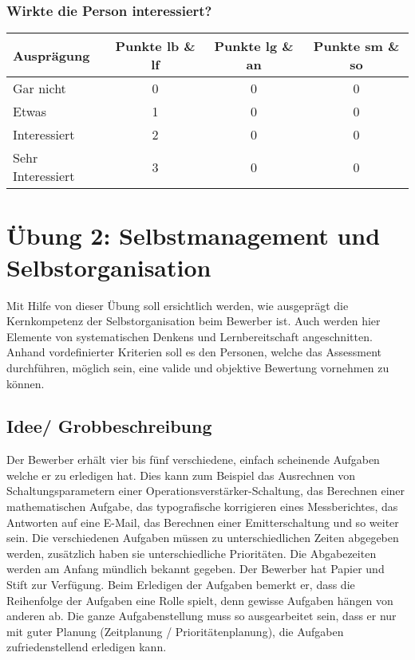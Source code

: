 \subsubsection{Wirkte die Person interessiert?}
\begin{tabular}{| l | c | c | c |}
  \hline	
  \textbf{Ausprägung} & \textbf{Punkte lb \& lf} & \textbf{Punkte lg \& an} & \textbf{Punkte sm \& so} \\
  \hline  		
  Gar nicht & 0  & 0 & 0 \\ 
  \hline
  Etwas & 1 & 0 & 0 \\ 
  \hline
  Interessiert & 2 & 0 & 0 \\
  \hline  
  Sehr Interessiert & 3 & 0 & 0 \\
  \hline  
\end{tabular}



\section{Übung 2: Selbstmanagement und Selbstorganisation}

Mit Hilfe von dieser Übung soll ersichtlich werden, wie ausgeprägt die Kernkompetenz der Selbstorganisation beim Bewerber ist. Auch werden hier Elemente von systematischen Denkens und Lernbereitschaft angeschnitten. Anhand vordefinierter Kriterien soll es den Personen, welche das Assessment durchführen, möglich sein, eine valide und objektive Bewertung vornehmen zu können.

\subsection{Idee/ Grobbeschreibung}

Der Bewerber erhält vier bis fünf verschiedene, einfach scheinende Aufgaben welche er zu erledigen hat. Dies kann zum Beispiel das Ausrechnen von Schaltungsparametern einer Operationsverstärker-Schaltung, das Berechnen einer
mathematischen Aufgabe, das typografische korrigieren eines Messberichtes, das Antworten auf eine E-Mail, das Berechnen einer Emitterschaltung und so weiter sein. Die verschiedenen Aufgaben müssen zu unterschiedlichen Zeiten abgegeben werden, zusätzlich haben sie unterschiedliche Prioritäten. Die Abgabezeiten werden am Anfang mündlich bekannt gegeben. Der Bewerber hat Papier und Stift zur Verfügung.
Beim Erledigen der Aufgaben bemerkt er, dass die Reihenfolge der Aufgaben eine Rolle spielt, denn gewisse Aufgaben hängen von anderen ab. Die ganze Aufgabenstellung muss so ausgearbeitet sein, dass er nur mit
guter Planung (Zeitplanung / Prioritätenplanung), die Aufgaben zufriedenstellend erledigen kann.

